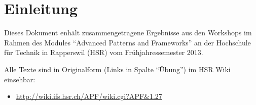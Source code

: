 \chapter*{Einleitung}

Dieses Dokument enhält zusammengetragene Ergebnisse aus den Workshops im Rahmen des Modules ``Advanced Patterns and Frameworks'' an der Hochschule für Technik in Rapperswil (HSR) vom Frühjahressemester 2013.

Alle Texte sind in Originalform (Links in Spalte ``Übung'') im HSR Wiki einsehbar:

\begin{itemize}
	\item \url{http://wiki.ifs.hsr.ch/APF/wiki.cgi?APF&1.27}
\end{itemize}